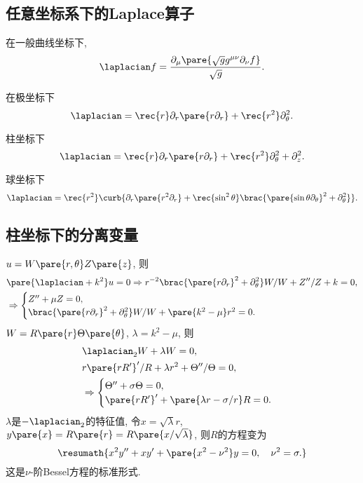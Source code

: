 \documentclass[hidelinks]{ctexart}
\begin{document}

\subsection{任意坐标系下的Laplace算子} %
\label{sub:任意坐标系下的laplace算子}

在一般曲线坐标下,
\[ \laplacian f = \frac{\partial_\mu\pare{\sqrt{g}g^{\mu\nu}\partial_\nu f}}{\sqrt{g}}. \]
\begin{ex}
    在极坐标下
    \[ \laplacian = \rec{r}\partial_r\pare{r\partial_r} + \rec{r^2}\partial^2_\theta. \]
\end{ex}
\begin{ex}
    柱坐标下
    \[ \laplacian = \rec{r}\partial_r\pare{r\partial_r} + \rec{r^2}\partial^2_\theta + \partial_z^2. \]
\end{ex}
\begin{ex}
    球坐标下
    \[ \laplacian = \rec{r^2} \curb{\partial_r \pare{r^2\partial_r} + \rec{\sin^2\theta} \brac{\pare{\sin\theta \partial_\theta}^2 + \partial_\theta^2} }. \]
\end{ex}


\subsection{柱坐标下的分离变量} %
\label{sub:柱坐标下的分离变量}

 $u = W\pare{r,\theta} Z\pare{z}$, 则
\begin{align*}
    & \pare{\laplacian + k^2} u = 0 \Rightarrow r^{-2}\brac{\pare{r\partial_r}^2 + \partial_\theta^2} W/W + Z''/Z + k = 0, \\
    & \Rightarrow \begin{cases}
        Z'' + \mu Z = 0, \\
        \brac{\pare{r\partial_r}^2 + \partial_\theta^2}W/W + \pare{k^2-\mu}r^2 = 0.
    \end{cases}
\end{align*}
 $W = R\pare{r}\Theta\pare{\theta}$, $\lambda = k^2 - \mu$, 则
\begin{align*}
    & \laplacian_2 W + \lambda W = 0, \\
    & r\pare{rR'}'/R + \lambda r^2 + \Theta''/\Theta = 0,\\
    & \Rightarrow  \begin{cases}
        \Theta'' + \sigma \Theta = 0, \\
        \pare{rR'}' + \pare{\lambda r - \sigma/r} R = 0.
    \end{cases}
\end{align*}
$\lambda$是$-\laplacian_2$的特征值, 令$x = \sqrt{\lambda}r$, $y\pare{x} = R\pare{r} = R\pare{x/\sqrt{\lambda}}$, 则$R$的方程变为
\[ \resumath{x^2y'' + xy' + \pare{x^2 - \nu^2} y = 0,\quad \nu^2 = \sigma.} \]
这是$\nu$-阶Bessel方程的标准形式.
\end{document}
